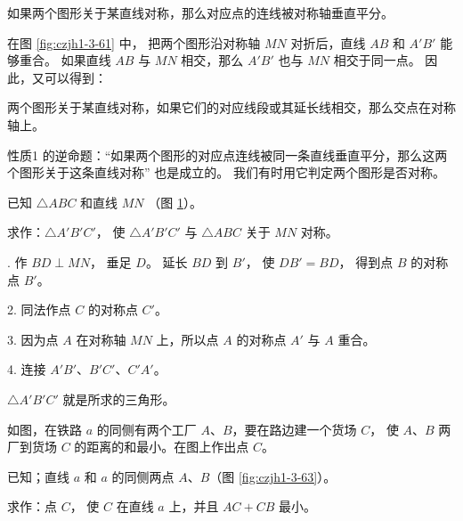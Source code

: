 \begin{xingzhi}[性质1]
    如果两个图形关于某直线对称，那么对应点的连线被对称轴垂直平分。
\end{xingzhi}

在图 \ref{fig:czjh1-3-61} 中， 把两个图形沿对称轴 $MN$ 对折后，直线 $AB$ 和 $A'B'$ 能够重合。
如果直线 $AB$ 与 $MN$ 相交，那么 $A'B'$ 也与 $MN$ 相交于同一点。 因此，又可以得到：

\begin{xingzhi}[性质2]
    两个图形关于某直线对称，如果它们的对应线段或其延长线相交，那么交点在对称轴上。
\end{xingzhi}

性质1 的逆命题：“如果两个图形的对应点连线被同一条直线垂直平分，那么这两个图形关于这条直线对称” 也是成立的。
我们有时用它判定两个图形是否对称。


\begin{figure}[htbp]
    \centering
    \begin{minipage}[b]{5.5cm}
        \centering
        
        \caption{}\label{fig:czjh1-3-61}
    \end{minipage}
    \qquad
    \begin{minipage}[b]{4.5cm}
        \centering
        
        \caption{}\label{fig:czjh1-3-62}
    \end{minipage}
\end{figure}


\liti 已知 $\triangle ABC$ 和直线 $MN$ （图 \ref{fig:czjh1-3-62}）。

求作：$\triangle A'B'C'$， 使 $\triangle A'B'C'$ 与 $\triangle ABC$ 关于 $MN$ 对称。

. 作 $BD \perp MN$， 垂足 $D$。 延长 $BD$ 到 $B'$， 使 $DB' = BD$， 得到点 $B$ 的对称点 $B'$。

2. 同法作点 $C$ 的对称点 $C'$。

3. 因为点 $A$ 在对称轴 $MN$ 上，所以点 $A$ 的对称点 $A'$ 与 $A$ 重合。

4. 连接 $A'B'$、$B'C'$、$C'A'$。

$\triangle A'B'C'$ 就是所求的三角形。

\liti 如图，在铁路 $a$ 的同侧有两个工厂 $A$、$B$，要在路边建一个货场 $C$，
使 $A$、$B$ 两厂到货场 $C$ 的距离的和最小。在图上作出点 $C$。

已知；直线 $a$ 和 $a$ 的同侧两点 $A$、$B$（图 \ref{fig:czjh1-3-63}）。

求作：点 $C$， 使 $C$ 在直线 $a$ 上，并且 $AC + CB$ 最小。

